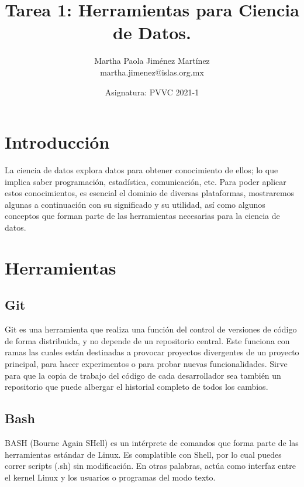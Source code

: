 \documentclass[12pt,letterpaper]{article}
\begin{document}
\title{\textbf{Tarea 1: Herramientas para Ciencia de Datos.}} \author{Martha Paola Jiménez Martínez
\\
\small{martha.jimenez@islas.org.mx}}
\date{ \small{Asignatura: PVVC 2021-1}
} 
\maketitle


\section*{Introducción}
La ciencia de datos explora datos para obtener conocimiento de ellos; lo que implica saber
programación, estadística, comunicación, etc. Para poder aplicar estos conocimientos, es esencial el
dominio de diversas plataformas, mostraremos algunas a continuación con su significado y su
utilidad, así como algunos conceptos que forman parte de las herramientas necesarias para la ciencia
de datos.

\section*{Herramientas}
\subsection*{Git}
Git es una herramienta que realiza una función del control de versiones de código de forma
distribuida, y no depende de un repositorio central. Este funciona con ramas las cuales están
destinadas a provocar proyectos divergentes de un proyecto principal, para hacer experimentos o para
probar nuevas funcionalidades.
\citep{rubio_2020}
Sirve para que la copia de trabajo del código de cada desarrollador sea también un repositorio que
puede albergar el historial completo de todos los cambios.
\citep{bitbucket_git}

\subsection*{Bash}
BASH (Bourne Again SHell) es un intérprete de comandos que forma parte de las herramientas estándar
de Linux. Es complatible con Shell, por lo cual puedes correr scripts (.sh) sin modificación. En
otras palabras, actúa como interfaz entre el kernel Linux y los usuarios o programas del modo texto.
\citep{canepa_2018}
\end{document}
